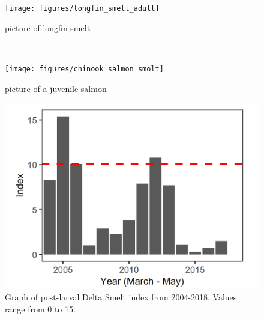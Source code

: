 \documentclass[
]{book}
\begin{document}
\begin{panel-grid}
\begin{columns-nocenter}
\begin{column800}

\begin{figure}

{\centering \texttt{[image: figures/longfin\_smelt\_adult]} 

}

\caption{picture of longfin smelt}\label{fig:unnamed-chunk-41}
\end{figure}

\end{column800}

\begin{column40}

~

\end{column40}

\begin{column800}

\begin{figure}

{\centering \texttt{[image: figures/chinook\_salmon\_smolt]} 

}

\caption{picture of a juvenile salmon}\label{fig:unnamed-chunk-42}
\end{figure}

\end{column800}

\end{columns-nocenter}

\begin{columns-nocenter}

\begin{column800}

\begin{expand}

\begin{figure}
\includegraphics[width=15.25in]{figures/20mm_DSM_recent} \caption{Graph of post-larval Delta Smelt index from 2004-2018. Values range from 0 to 15.}\label{fig:unnamed-chunk-43}
\end{figure}


\end{expand}
\end{column800}
\end{columns-nocenter}
\end{panel-grid}
\end{document}
